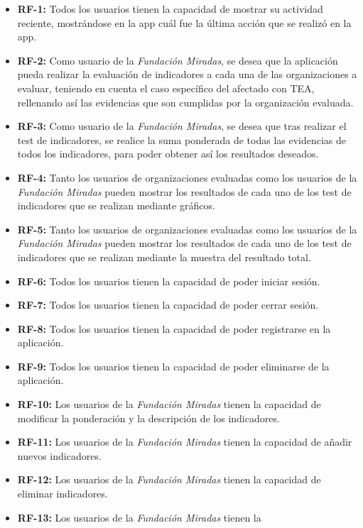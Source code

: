\begin{itemize}
	\item \textbf{RF-1:} Todos los usuarios tienen la capacidad de mostrar su
	actividad reciente, mostrándose en la app cuál fue la última acción que se
	realizó en la app.
	\item \textbf{RF-2:} Como usuario de la \textit{Fundación Miradas}, se desea
	que la aplicación pueda realizar la evaluación de indicadores a cada una de
	las organizaciones a evaluar, teniendo en cuenta el caso específico del
	afectado con TEA, rellenando así las evidencias que son cumplidas por la
	organización evaluada.
	\item \textbf{RF-3:} Como usuario de la \textit{Fundación Miradas}, se desea
	que tras realizar el test de indicadores, se realice la suma ponderada de
	todas las evidencias de todos los indicadores, para poder obtener así los
	resultados deseados.
	\item \textbf{RF-4:} Tanto los usuarios de organizaciones evaluadas como los
	usuarios de la \textit{Fundación Miradas} pueden mostrar los resultados de
	cada uno de los test de indicadores que se realizan mediante gráficos.
	\item \textbf{RF-5:} Tanto los usuarios de organizaciones evaluadas como los
	usuarios de la \textit{Fundación Miradas} pueden mostrar los resultados de
	cada uno de los test de indicadores que se realizan mediante la muestra del
	resultado total.
	\item \textbf{RF-6:} Todos los usuarios tienen la capacidad de poder iniciar
	sesión.
	\item \textbf{RF-7:} Todos los usuarios tienen la capacidad de poder cerrar sesión.
	\item \textbf{RF-8:} Todos los usuarios tienen la capacidad de poder
	registrarse en la aplicación.
	\item \textbf{RF-9:} Todos los usuarios tienen la capacidad de poder
	eliminarse de la aplicación.
	\item \textbf{RF-10:} Los usuarios de la \textit{Fundación Miradas} tienen la
	capacidad de modificar la ponderación y la descripción de los indicadores.
	\item \textbf{RF-11:} Los usuarios de la \textit{Fundación Miradas} tienen la
	capacidad de añadir nuevos indicadores.
	\item \textbf{RF-12:} Los usuarios de la \textit{Fundación Miradas} tienen la
	capacidad de eliminar indicadores.
	\item \textbf{RF-13:} Los usuarios de la \textit{Fundación Miradas} tienen la

\end{itemize}
